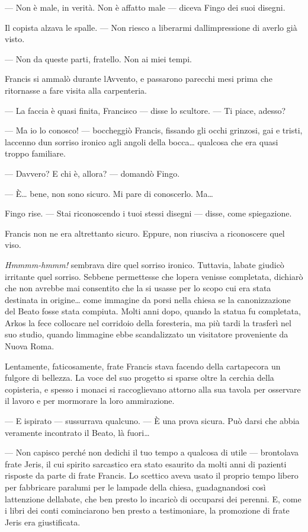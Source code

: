 --- Non è male, in verità. Non è affatto male --- diceva Fingo dei suoi
disegni.

Il copista alzava le spalle. --- Non riesco a liberarmi
dall\textquotesingle impressione di averlo già visto.

--- Non da queste parti, fratello. Non ai miei tempi.

Francis si ammalò durante l\textquotesingle Avvento, e passarono
parecchi mesi prima che ritornasse a fare visita alla carpenteria.

--- La faccia è quasi finita, Francisco --- disse lo scultore. --- Ti
piace, adesso?

--- Ma io lo conosco! --- boccheggiò Francis, fissando gli occhi
grinzosi, gai e tristi, l\textquotesingle accenno d\textquotesingle un
sorriso ironico agli angoli della bocca\ldots{} qualcosa che era quasi
troppo familiare.

--- Davvero? E chi è, allora? --- domandò Fingo.

--- È\ldots{} bene, non sono sicuro. Mi pare di conoscerlo. Ma\ldots{}

Fingo rise. --- Stai riconoscendo i tuoi stessi disegni --- disse, come
spiegazione.

Francis non ne era altrettanto sicuro. Eppure, non riusciva a
riconoscere quel viso.

\emph{Hmmmm-hmmm!} sembrava dire quel sorriso ironico. Tuttavia,
l\textquotesingle abate giudicò irritante quel sorriso. Sebbene
permettesse che l\textquotesingle opera venisse completata, dichiarò che
non avrebbe mai consentito che la si usasse per lo scopo cui era stata
destinata in origine\ldots{} come immagine da porsi nella chiesa se la
canonizzazione del Beato fosse stata compiuta. Molti anni dopo, quando
la statua fu completata, Arkos la fece collocare nel corridoio della
foresteria, ma più tardi la trasferì nel suo studio, quando
l\textquotesingle immagine ebbe scandalizzato un visitatore proveniente
da Nuova Roma.

Lentamente, faticosamente, frate Francis stava facendo della cartapecora
un fulgore di bellezza. La voce del suo progetto si sparse oltre la
cerchia della copisteria, e spesso i monaci si raccoglievano attorno
alla sua tavola per osservare il lavoro e per mormorare la loro
ammirazione.

--- E ispirato --- sussurrava qualcuno. --- È una prova sicura. Può
darsi che abbia veramente incontrato il Beato, là fuori\ldots{}

--- Non capisco perché non dedichi il tuo tempo a qualcosa di utile ---
brontolava frate Jeris, il cui spirito sarcastico era stato esaurito da
molti anni di pazienti risposte da parte di frate Francis. Lo scettico
aveva usato il proprio tempo libero per fabbricare paralumi per le
lampade della chiesa, guadagnandosi così l\textquotesingle attenzione
dell\textquotesingle abate, che ben presto lo incaricò di occuparsi dei
perenni. E, come i libri dei conti cominciarono ben presto a
testimoniare, la promozione di frate Jeris era giustificata.

